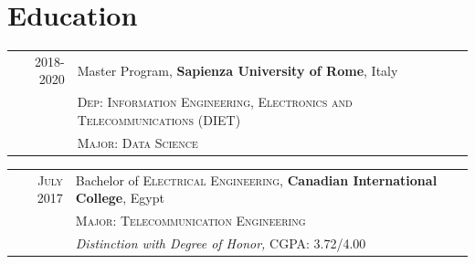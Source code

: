 \documentclass[a4paper,10pt]{article}
\begin{document}


\section{Education}

\begin{tabular}{rl}	
 \textsc 2018-2020 & Master Program, \textbf{Sapienza University of Rome}, Italy
 \\&
 \textsc{Dep: Information Engineering, Electronics and Telecommunications (DIET)}\\&
\textsc{Major: Data Science}
\end{tabular}

\begin{tabular}{rl}	
 \textsc{July} 2017 & Bachelor of  \textsc{Electrical Engineering}, \textbf{Canadian International College}, Egypt
 \\&
\textsc{Major: Telecommunication Engineering}\\&
\small\emph{Distinction with Degree of Honor, }
\textsc{CGPA: 3.72/4.00 }
 
\end{tabular}


\end{document}
